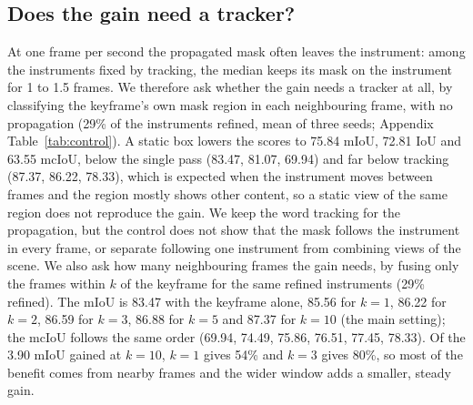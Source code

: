 \subsection{Does the gain need a tracker?}
\label{sec:control}
At one frame per second the propagated mask often leaves the instrument: among the instruments fixed by tracking, the median keeps its mask on the instrument for 1 to 1.5 frames.
We therefore ask whether the gain needs a tracker at all, by classifying the keyframe's own mask region in each neighbouring frame, with no propagation (29\% of the instruments refined, mean of three seeds; Appendix Table~\ref{tab:control}).
A static box lowers the scores to 75.84 mIoU, 72.81 IoU and 63.55 mcIoU, below the single pass (83.47, 81.07, 69.94) and far below tracking (87.37, 86.22, 78.33), which is expected when the instrument moves between frames and the region mostly shows other content, so a static view of the same region does not reproduce the gain.
We keep the word tracking for the propagation, but the control does not show that the mask follows the instrument in every frame, or separate following one instrument from combining views of the scene.
We also ask how many neighbouring frames the gain needs, by fusing only the frames within $k$ of the keyframe for the same refined instruments (29\% refined).
The mIoU is 83.47 with the keyframe alone, 85.56 for $k{=}1$, 86.22 for $k{=}2$, 86.59 for $k{=}3$, 86.88 for $k{=}5$ and 87.37 for $k{=}10$ (the main setting); the mcIoU follows the same order (69.94, 74.49, 75.86, 76.51, 77.45, 78.33).
Of the 3.90 mIoU gained at $k{=}10$, $k{=}1$ gives 54\% and $k{=}3$ gives 80\%, so most of the benefit comes from nearby frames and the wider window adds a smaller, steady gain.
